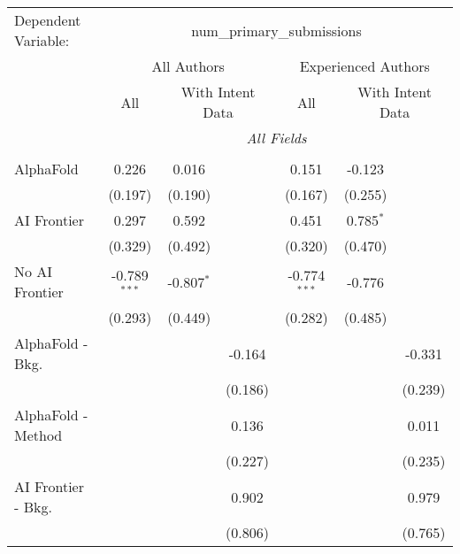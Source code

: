 \begingroup
\centering
\begin{tabular}{lcccccc}
   \tabularnewline \midrule \midrule
   Dependent Variable: & \multicolumn{6}{c}{num\_primary\_submissions}\\
 & \multicolumn{3}{c}{All Authors} & \multicolumn{3}{c}{Experienced Authors} \\
\cmidrule(lr){2-4} \cmidrule(lr){5-7}
 & \multicolumn{1}{c}{All} & \multicolumn{2}{c}{With Intent Data} & \multicolumn{1}{c}{All} & \multicolumn{2}{c}{With Intent Data} \\
\cmidrule(lr){2-2} \cmidrule(lr){3-4} \cmidrule(lr){5-5} \cmidrule(lr){6-7}
 & \multicolumn{6}{c}{\textit{All Fields}} \\ \\
   AlphaFold               & 0.226          & 0.016        &               & 0.151          & -0.123      &   \\   
                           & (0.197)        & (0.190)      &               & (0.167)        & (0.255)     &   \\   
   AI Frontier             & 0.297          & 0.592        &               & 0.451          & 0.785$^{*}$ &   \\   
                           & (0.329)        & (0.492)      &               & (0.320)        & (0.470)     &   \\   
   No AI Frontier          & -0.789$^{***}$ & -0.807$^{*}$ &               & -0.774$^{***}$ & -0.776      &   \\   
                           & (0.293)        & (0.449)      &               & (0.282)        & (0.485)     &   \\   
   AlphaFold - Bkg.        &                &              & -0.164        &                &             & -0.331\\   
                           &                &              & (0.186)       &                &             & (0.239)\\   
   AlphaFold - Method      &                &              & 0.136         &                &             & 0.011\\   
                           &                &              & (0.227)       &                &             & (0.235)\\   
   AI Frontier - Bkg.      &                &              & 0.902         &                &             & 0.979\\   
                           &                &              & (0.806)       &                &             & (0.765)\\   

\end{tabular}
